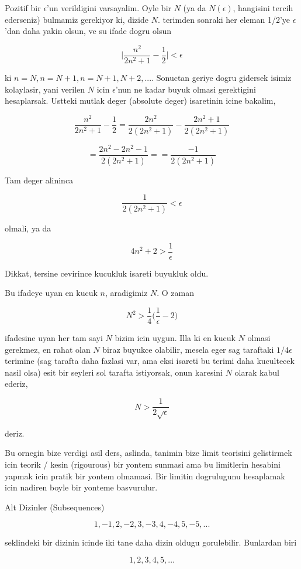 \documentclass[12pt,fleqn]{article}\usepackage{../common}
\begin{document}
Pozitif bir $\epsilon$'un verildigini varsayalim. Oyle bir $N$ (ya da
$N(\epsilon)$, hangisini tercih ederseniz) bulmamiz gerekiyor ki, dizide
$N$. terimden sonraki her eleman 1/2'ye $\epsilon$'dan daha yakin olsun, ve
su ifade dogru olsun

\[ 
\bigg|\frac{n^2}{2n^2+1} - \frac{1}{2}\bigg| < \epsilon
 \]

ki $n=N,n=N+1,n=N+1,N+2,...$. Sonuctan geriye dogru gidersek isimiz
kolaylasir, yani verilen $N$ icin $\epsilon$'nun ne kadar buyuk olmasi
gerektigini hesaplarsak. Ustteki mutlak deger (absolute deger) isaretinin 
icine bakalim, 

\[ 
\frac{n^2}{2n^2+1}  - \frac{1}{2} = 
\frac{2n^2}{2(2n^2+1)}  - \frac{2n^2+1}{2(2n^2+1)} 
 \]

\[  
= \frac{2n^2 - 2n^2 - 1}{2(2n^2+1)} = 
= \frac{- 1}{2(2n^2+1)} 
\]

Tam deger alininca 

\[  \frac{1}{2(2n^2+1)} < \epsilon\]

olmali, ya da

\[ 4n^2 + 2 > \frac{1}{\epsilon} \]

Dikkat, tersine cevirince kucukluk isareti buyukluk oldu. 

Bu ifadeye uyan en kucuk $n$, aradigimiz $N$. O zaman 

\[ N^2 > \frac{1}{4}\bigg(\frac{1}{\epsilon} - 2\bigg) \]

ifadesine uyan her tam sayi $N$ bizim icin uygun. Illa ki en kucuk $N$
olmasi gerekmez, en rahat olan $N$ biraz buyukce olabilir, mesela eger sag
taraftaki $1/4\epsilon$ terimine (sag tarafta daha fazlasi var, ama eksi
isareti bu terimi daha kucultecek nasil olsa) esit bir seyleri sol tarafta
istiyorsak, onun karesini $N$ olarak kabul ederiz,

\[ N > \frac{1}{2\sqrt{\epsilon}} \]

deriz. 

Bu ornegin bize verdigi asil ders, aslinda, tanimin bize limit teorisini
gelistirmek icin teorik / kesin (rigourous) bir yontem sunmasi ama bu
limitlerin hesabini yapmak icin pratik bir yontem olmamasi. Bir limitin
dogrulugunu hesaplamak icin nadiren boyle bir yonteme basvurulur. 

Alt Dizinler (Subsequences) 

\[ 1, -1, 2, -2, 3, -3, 4, -4, 5, -5, . . . \]

seklindeki bir dizinin icinde iki tane daha dizin oldugu
gorulebilir. Bunlardan biri

\[ 1, 2, 3, 4, 5, ... \]
\end{document}

